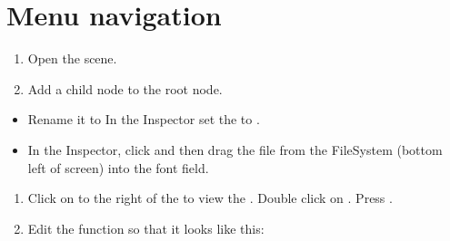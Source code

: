 \documentclass[letterpaper,10pt,english]{sphinxmanual}
\begin{document}
\section{Menu navigation}
\label{\detokenize{tutorial:menu-navigation}}\begin{enumerate}
%
\item {} 
\sphinxAtStartPar
Open the  scene.

\item {} 
\sphinxAtStartPar
Add a  child node to the root node.

\end{enumerate}
\begin{itemize}
\item {} 
\sphinxAtStartPar
Rename it to  In the Inspector set the  to
.

\item {} 
\sphinxAtStartPar
In the Inspector, click  and then drag the
 file from the FileSystem (bottom left of screen) into
the \sphinxstylestrong{{[}empty{]}} font field.

\sphinxAtStartPar
{}

\end{itemize}
\begin{enumerate}
%
\setcounter{enumi}{2}
\item {} 
\sphinxAtStartPar
Click on  to the right of the  to view the
. Double click on . Press .

\item {} 
\sphinxAtStartPar
Edit the function so that it looks like this:

\end{enumerate}
\end{document}
